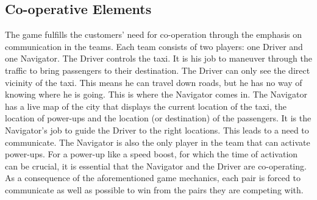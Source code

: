 \subsection{Co-operative Elements}
The game fulfills the customers' need for co-operation through the emphasis on communication in the teams. Each team consists of two players: one Driver and one Navigator. The Driver controls the taxi. It is his job to maneuver through the traffic to bring passengers to their destination. The Driver can only see the direct vicinity of the taxi. This means he can travel down roads, but he has no way of knowing where he is going. This is where the Navigator comes in. The Navigator has a live map of the city that displays the current location of the taxi, the location of power-ups and the location (or destination) of the passengers. It is the Navigator's job to guide the Driver to the right locations. This leads to a need to communicate. The Navigator is also the only player in the team that can activate power-ups. For a power-up like a speed boost, for which the time of activation can be crucial, it is essential that the Navigator and the Driver are co-operating. As a consequence of the aforementioned game mechanics, each pair is forced to communicate as well as possible to win from the pairs they are competing with.


